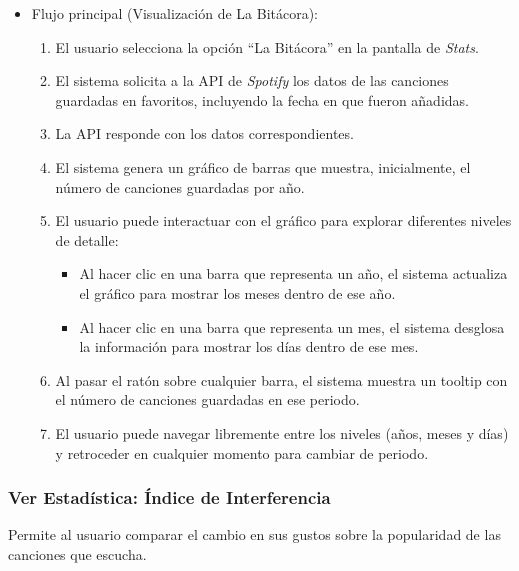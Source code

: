 \begin{itemize}
    \item Flujo principal (Visualización de La Bitácora):
          \begin{enumerate}
              \item El usuario selecciona la opción ``La Bitácora'' en la pantalla de \textit{Stats}.
              \item El sistema solicita a la API de \textit{Spotify} los datos de las canciones guardadas en favoritos, incluyendo la fecha en que fueron añadidas.
              \item La API responde con los datos correspondientes.
              \item El sistema genera un gráfico de barras que muestra, inicialmente, el número de canciones guardadas por año.
              \item El usuario puede interactuar con el gráfico para explorar diferentes niveles de detalle:
                    \begin{itemize}
                        \item Al hacer clic en una barra que representa un año, el sistema actualiza el gráfico para mostrar los meses dentro de ese año.
                        \item Al hacer clic en una barra que representa un mes, el sistema desglosa la información para mostrar los días dentro de ese mes.
                    \end{itemize}
              \item Al pasar el ratón sobre cualquier barra, el sistema muestra un tooltip con el número de canciones guardadas en ese periodo.
              \item El usuario puede navegar libremente entre los niveles (años, meses y días) y retroceder en cualquier momento para cambiar de periodo.
          \end{enumerate}
\end{itemize}

\subsubsection*{Ver Estadística: Índice de Interferencia}

Permite al usuario comparar el cambio en sus gustos sobre la popularidad de las canciones que escucha.

